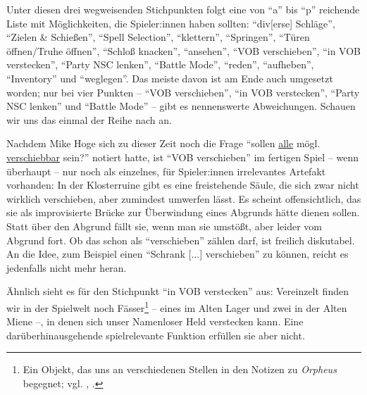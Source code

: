 \documentclass[a5paper,pagesize,numbers=noenddot]{scrbook}
\begin{document}
Unter diesen drei wegweisenden Stichpunkten folgt eine von \enquote{a} bis \enquote{p} reichende Liste mit Möglichkeiten, die Spieler:innen haben sollten:
\enquote{div[erse] Schläge}, \enquote{Zielen \& Schießen}, \enquote{Spell Selection}, \enquote{klettern}, \enquote{Springen}, \enquote{Türen öffnen/Truhe öffnen}, \enquote{Schloß knacken}, \enquote{ansehen}, \enquote{VOB verschieben}, \enquote{in VOB verstecken}, \enquote{Party NSC lenken}, \enquote{Battle Mode}, \enquote{reden}, \enquote{aufheben}, \enquote{Inventory} und \enquote{weglegen}.
Das meiste davon ist am Ende auch umgesetzt worden; nur bei vier Punkten -- \enquote{VOB verschieben}, \enquote{in VOB verstecken}, \enquote{Party NSC lenken} und \enquote{Battle Mode} -- gibt es nennenswerte Abweichungen.
Schauen wir uns das einmal der Reihe nach an.

Nachdem Mike Hoge sich zu dieser Zeit noch die Frage \enquote{sollen \uline{alle} mögl. \uline{verschiebbar} sein?}\autocite[S.~3]{orpheus_interface} notiert hatte, ist \enquote{VOB verschieben} im fertigen Spiel -- wenn überhaupt -- nur noch als einzelnes, für Spieler:innen irrelevantes Artefakt vorhanden:
In der Klosterruine gibt es eine freistehende Säule, die sich zwar nicht wirklich verschieben, aber zumindest umwerfen lässt.
Es scheint offensichtlich, das sie als improvisierte Brücke zur Überwindung eines Abgrunds hätte dienen sollen.
Statt über den Abgrund fällt sie, wenn man sie umstößt, aber leider vom Abgrund fort.
Ob das schon als \enquote{verschieben} zählen darf, ist freilich diskutabel.
An die Idee, zum Beispiel einen \enquote{Schrank [$\ldots$] verschieben}\autocite[S.~3]{orpheus_interface} zu können, reicht es jedenfalls nicht mehr heran.

Ähnlich sieht es für den Stichpunkt \enquote{in VOB verstecken} aus:
Vereinzelt finden wir in der Spielwelt noch Fässer\footnote{Ein Objekt, das uns an verschiedenen Stellen in den Notizen zu \textit{Orpheus} begegnet; vgl. \autocite[S.~19]{orpheus_b_scribbles}, \autocite[S.~6]{orpheus_interface}.} -- eines im Alten Lager und zwei in der Alten Miene --, in denen sich unser Namenloser Held verstecken kann.
Eine darüberhinausgehende spielrelevante Funktion erfüllen sie aber nicht.
\end{document}
